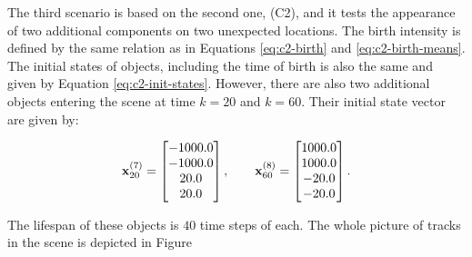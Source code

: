 The third scenario is based on the second one, (C2), and it tests the appearance of two additional components on two unexpected locations. The birth intensity is defined by the same relation as in Equations \ref{eq:c2-birth} and \ref{eq:c2-birth-means}. The initial states of objects, including the time of birth is also the same and given by Equation \ref{eq:c2-init-states}. However, there are also two additional objects entering the scene at time $k=20$ and $k=60$. Their initial state vector are given by:

\begin{equation}\label{eq:c3-additional-states}
    \svecat{x}{20}{(7)} = \begin{bmatrix}
        -1000.0 \\
        -1000.0 \\
        20.0 \\
        20.0
    \end{bmatrix},
    \qquad
    \svecat{x}{60}{(8)} = \begin{bmatrix}
        1000.0 \\
        1000.0 \\
        -20.0 \\
        -20.0
    \end{bmatrix}.
\end{equation}

The lifespan of these objects is $40$ time steps of each. The whole picture of tracks in the scene is depicted in Figure 

